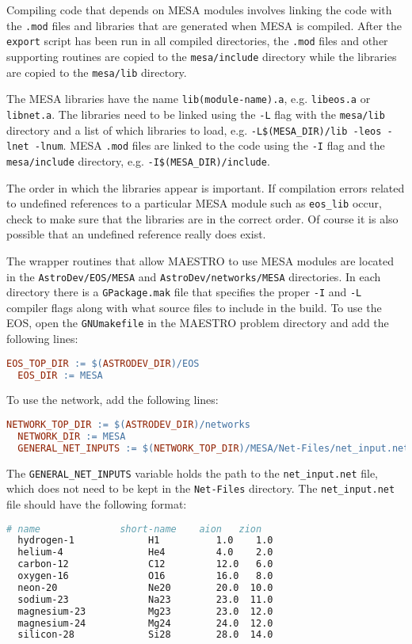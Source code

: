 Compiling code that depends on {\sf MESA} modules involves linking the code 
with the {\tt .mod} files and libraries that are generated when {\sf MESA} 
is compiled. After the {\tt export} script has been run in all compiled 
directories, the {\tt .mod} files and other supporting routines are 
copied to the {\tt mesa/include} directory while the libraries are copied to 
the {\tt mesa/lib} directory.

The {\sf MESA} libraries have the name {\tt lib(module-name).a}, e.g. 
{\tt libeos.a} or {\tt libnet.a}. The libraries need to be linked using the 
{\tt -L} flag with the {\tt mesa/lib} directory and a list of which libraries 
to load, e.g. {\tt -L\$(MESA\_DIR)/lib -leos -lnet -lnum}. {\sf MESA} 
{\tt .mod} files are linked to the code using the {\tt -I} flag and the 
{\tt mesa/include} directory, e.g. {\tt -I\$(MESA\_DIR)/include}. 

The order in which the libraries appear is important. If compilation errors 
related to undefined references to a particular {\sf MESA} module such as 
{\tt eos\_lib} occur, check to make sure that the libraries are in the correct 
order. Of course it is also possible that an undefined reference really does 
exist.

The wrapper routines that allow {\sf MAESTRO} to use {\sf MESA} modules are 
located in the {\tt AstroDev/EOS/MESA} and {\tt AstroDev/networks/MESA} 
directories. In each directory there is a {\tt GPackage.mak} file that 
specifies the proper {\tt -I} and {\tt -L} compiler flags along with what 
source files to include in the build. To use the EOS, open the 
{\tt GNUmakefile} in the {\sf MAESTRO} problem directory and add the 
following lines:
\begin{lstlisting}[language=make,mathescape=false]
  EOS_TOP_DIR := $(ASTRODEV_DIR)/EOS
  EOS_DIR := MESA
\end{lstlisting}
To use the network, add the following lines:
\begin{lstlisting}[language=make,mathescape=false]
  NETWORK_TOP_DIR := $(ASTRODEV_DIR)/networks
  NETWORK_DIR := MESA
  GENERAL_NET_INPUTS := $(NETWORK_TOP_DIR)/MESA/Net-Files/net_input.net
\end{lstlisting}
The {\tt GENERAL\_NET\_INPUTS} variable holds the path to the
{\tt net\_input.net} file, which does not need to be kept in the
{\tt Net-Files} directory. The {\tt net\_input.net} file should have the 
following format:
\begin{lstlisting}[language=make,mathescape=false]
  # name              short-name    aion   zion
  hydrogen-1             H1          1.0    1.0
  helium-4               He4         4.0    2.0
  carbon-12              C12         12.0   6.0
  oxygen-16              O16         16.0   8.0
  neon-20                Ne20        20.0  10.0
  sodium-23              Na23        23.0  11.0
  magnesium-23           Mg23        23.0  12.0
  magnesium-24           Mg24        24.0  12.0
  silicon-28             Si28        28.0  14.0
\end{lstlisting}


